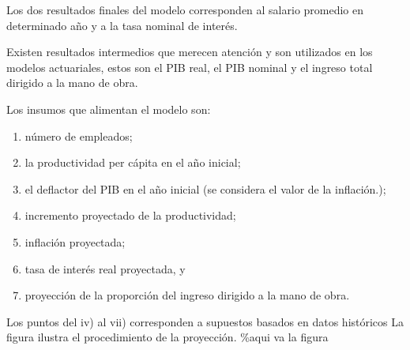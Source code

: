 Los dos resultados finales del modelo corresponden al salario promedio
en determinado año y a la tasa nominal de interés.

Existen resultados intermedios que merecen atención y son utilizados en
los modelos actuariales, estos son el PIB real, el PIB nominal y el
ingreso total dirigido a la mano de obra.

Los insumos que alimentan el modelo son:

\renewcommand{\theenumi}{\roman{enumi}}

\begin{enumerate}
\item número de empleados; 
\item la productividad per cápita en el año inicial;
\item el deflactor del PIB en el año inicial (se considera el valor de la inflación.); 
\item incremento proyectado de la productividad;
\item inflación proyectada;
\item tasa de interés real proyectada, y
\item proyección de la proporción del ingreso dirigido a la mano de obra.
\end{enumerate}

Los puntos del iv) al vii) corresponden a supuestos basados en datos
históricos La figura ilustra el procedimiento de la proyección. \%aqui
va la figura

